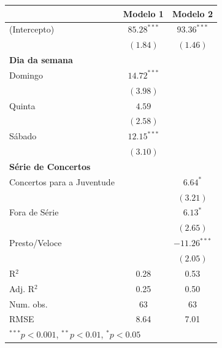 \documentclass[a4paper, 12pt, openright, oneside, german, french, english, brazil]{abntex2}
\begin{document}
	
	\begin{table}[!h]
		{\begin{tabular}{l c c }
				\hline
				& Modelo 1 & Modelo 2 \\
				\hline
				(Intercepto)                                        & $85.28^{***}$ & $93.36^{***}$  \\
				& $(1.84)$      & $(1.46)$       \\
				\textbf{Dia da semana} & & \\
				Domingo & $14.72^{***}$ &                \\
				& $(3.98)$      &                \\
				Quinta  & $4.59$        &                \\
				& $(2.58)$      &                \\
				Sábado  & $12.15^{***}$ &                \\
				& $(3.10)$      &                \\
				\textbf{Série de Concertos} & & \\
				Concertos para a Juventude                    &               & $6.64^{*}$     \\
				&               & $(3.21)$       \\
				Fora de Série                                 &               & $6.13^{*}$     \\
				&               & $(2.65)$       \\
				Presto/Veloce                                 &               & $-11.26^{***}$ \\
				&               & $(2.05)$       \\
				\hline
				R$^2$                                              & 0.28          & 0.53           \\
				Adj. R$^2$                                         & 0.25          & 0.50           \\
				Num. obs.                                          & 63            & 63             \\
				RMSE                                               & 8.64          & 7.01           \\
				\hline
				\multicolumn{3}{l}{\scriptsize{$^{***}p<0.001$, $^{**}p<0.01$, $^*p<0.05$}}
			\end{tabular}
		}
		{}
	\end{table}
	
\end{document}
